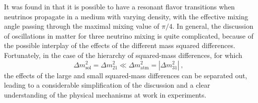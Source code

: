 It was found in  that it is possible to have a resonant flavor transitions %
when neutrinos propagate in a medium with varying density, with the effective mixing angle %
passing through the maximal mixing value of $\pi/4$.
In general, the discussion of oscillations in matter for three neutrino mixing is quite complicated, %
because of the possible interplay of the effects of the different mass squared differences.
Fortunately, in the case of the hierarchy of squared-mass differences, for which
\begin{equation}
	\label{eq:hierarchy}
	\Delta m^2_\text{sol} = \Delta m^2_{21} \ll \Delta m^2_\text{atm} = |\Delta m^2_{31}|\ ,
\end{equation}
the effects of the large and small squared-mass differences can be separated out, %
leading to a considerable simplification of the discussion and a clear understanding of the %
physical mechanisms at work in experiments.

